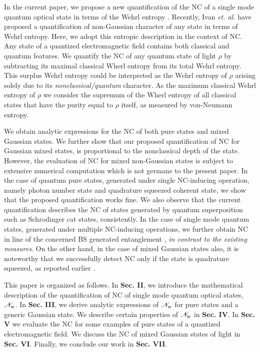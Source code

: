 \documentclass[letter,scriptaddress,twocolumn,prl,showkeys]{revtex4}
\begin{document}
In the current paper, we propose a new quantification of the NC of a single mode quantum optical state in terms of the Wehrl entropy \cite{we_wehrl}. 
Recently, Ivan {\em et. al.} \cite{ngm_we_ivan} have proposed a quantification of non-Gaussian character of any state in terms of Wehrl entropy. 
Here, we adopt this entropic description in the context of NC.
Any state of a quantized electromagnetic field contains both classical and quantum features. 
We quantify the NC of any quantum state of light $\rho$ by subtracting its maximal classical Wherl entropy from its total Wehrl entropy. 
This surplus Wehrl entropy could be interpreted as the Wehrl entropy of $\rho$ arising solely due to its {\em nonclassical/quantum} character. 
As the maximum classical Wehrl entropy of $\rho$ we consider the supremum of the Wherl entropy of all classical states that have the purity equal to $\rho$ itself, as measured by von-Neumann entropy.

We obtain analytic expressions for the NC of both pure states and mixed Gaussian states. 
We further show that our proposed quantification of NC for Gaussian mixed states, is proportional to the nonclassical depth of the state.
However, the evaluation of NC for mixed non-Gaussian states is subject to extensive numerical computation which is not germane to the present paper. 
In the case of quantum pure states, generated under single NC-inducing operation, namely photon number state and quadrature squeezed coherent state, we show that the proposed quantification works fine. 
We also observe that the current quantification describes the NC of states generated by quantum superposition such as Schrodinger cat states, consistently. 
In the case of single mode quantum states, generated under multiple NC-inducing operations, we further obtain NC in line of the concerned BS generated entanglement \cite{nc_bsent_bose_kumar}, {\em in contrast to the existing measures}. 
On the other hand, in the case of mixed Gaussian states also, it is noteworthy that we successfully detect NC only if the state is quadrature squeezed, as reported earlier \cite{ncm_ln_asboth}.

This paper is organized as follows. In {\bf Sec. II}, we introduce the mathematical description of the quantification of NC of single mode quantum optical states, $\mathscr{N}_{\rm{w}}$. 
In {\bf Sec. III}, we derive analytic expressions of $\mathscr{N}_{\rm{w}}$ for pure states and a generic Gaussian state. 
We describe certain properties of $\mathscr{N}_{\rm{w}}$ in {\bf Sec. IV}. 
In {\bf Sec. V} we evaluate the NC for some examples of pure states of a quantized electromagnetic field. 
We discuss the NC of mixed Gaussian states of light in {\bf Sec. VI}. 
Finally, we conclude our work in {\bf Sec. VII}.
\end{document}
